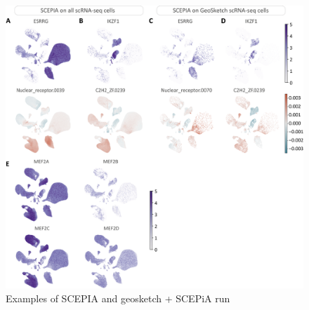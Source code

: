 \begin{figure}
    \centering
    \includegraphics[height=0.666\linewidth]{ch.scepia/imgs/SCEPIA_SCEPIAGEO_BiologicalExamples_SuppFig2_v2.png}
    \caption{Examples of SCEPIA and geosketch + SCEPiA run}
    \label{fig:scepia_features2}
\end{figure}